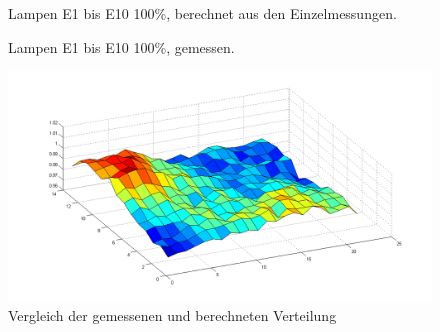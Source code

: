 \documentclass[a4paper,bibtotoc,oneside]{scrbook}
\begin{document}
\begin{figure} [htbp]
\caption{Lampen E1 bis E10 100\%, berechnet aus den Einzelmessungen.}
\label{b100}
\end{figure} 

\begin{figure} [htbp]
\caption{Lampen E1 bis E10 100\%, gemessen. }
\label{m100}
\end{figure} 

\begin{figure}[htbp]
\centering
\includegraphics[width=125mm]{img/vergleich100.png}
\caption{Vergleich der gemessenen und berechneten Verteilung}\label{v100}
\end{figure}
\end{document}
